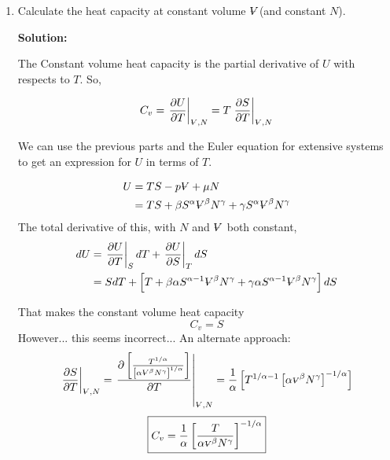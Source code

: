 \documentclass[10pt]{article}
\newenvironment{Solution}
    {\textbf{Solution:}
    
    \vspace{5mm}
    \begin{tcolorbox}
    }
    {
    \end{tcolorbox}
    \vspace{5mm}
    }
\newcommand{\vol}{{\ooalign{\hfil$V$\hfil\cr\kern0.08em--\hfil\cr}}}
\begin{document}
\begin{enumerate}
\begin{enumerate}
\begin{Solution}
    \end{Solution}
    \newpage 


    \item Calculate the heat capacity at constant volume $\vol$(and constant $N$).
    
    \begin{Solution}    
    The Constant volume heat capacity is the partial derivative of $U$ with respects to $T$. So,
    
    \begin{equation}
        C_v = \left.\frac{\partial U}{\partial T}\right|_{\scriptsize{\vol},N} = T\left.\frac{\partial S}{\partial T}\right|_{\scriptsize{\vol},N}
    \end{equation}


    We can use the previous parts and the Euler equation for extensive systems to get an expression for $U$ in terms of $T$.
    
    \begin{align}
        U &= TS - p\vol + \mu N\\
        &= T S + \beta S^\alpha \vol^\beta N^\gamma + \gamma S^\alpha \vol^\beta N^\gamma
    \end{align}
    The total derivative of this, with $N$ and $\vol$ both constant,
    \begin{align}
        dU &= \left.\frac{\partial U}{\partial T}\right|_S dT + \left.\frac{\partial U}{\partial S}\right|_T dS\\
        &= S dT + \left[T + \beta\alpha S^{\alpha-1}\vol^\beta N^\gamma + \gamma\alpha S^{\alpha-1}\vol^\beta N^\gamma\right]dS
    \end{align}
    
    That makes the constant volume heat capacity
    \begin{equation}
    \boxed{
    C_v = S
    }        
    \end{equation}
    However... this seems incorrect... 
    An alternate approach: 
        \begin{equation}
        \left.\frac{\partial S}{\partial T}\right|_{\scriptsize{\vol},N} = \left.\frac{\partial \left[ \frac{T^{1/\alpha}}{\left[\alpha \scriptsize{\vol}^{\beta}N^{\gamma} \right]^{1/\alpha}} \right]}{\partial T}\right|_{\scriptsize{\vol},N} = \frac{1}{\alpha}\left[ T^{1/\alpha-1}\left[\alpha \scriptsize{\vol}^{\beta}N^{\gamma} \right]^{-1/\alpha} \right]
    \end{equation}
    \begin{equation}
    \boxed{
        C_v = \frac{1}{\alpha}\left[\frac{T}{\alpha \scriptsize{\vol}^{\beta}N^{\gamma}} \right]^{-1/\alpha}
        }
    \end{equation}
    

\end{Solution}
\end{enumerate}
\end{enumerate}
\end{document}
